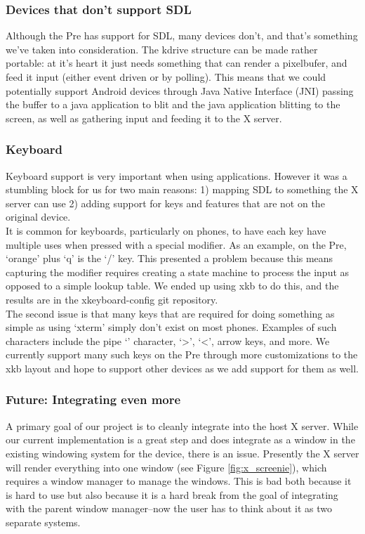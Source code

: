 \subsubsection{Devices that don't support SDL}
Although the Pre has support for SDL, many devices don't, and that's something we've taken into consideration.  The kdrive structure can be made rather portable: at it's heart it just needs something that can render a pixelbufer, and feed it input (either event driven or by polling).  This means that we could potentially support Android devices through Java Native Interface (JNI) \cite{jni} passing the buffer to a java application to blit and the java application blitting to the screen, as well as gathering input and feeding it to the X server.
\subsubsection{Keyboard}
Keyboard support is very important when using applications.  However it was a stumbling block for us for two main reasons: 1) mapping SDL to something the X server can use 2) adding support for keys and features that are not on the original device.\\

It is common for keyboards, particularly on phones, to have each key have multiple uses when pressed with a special modifier.  As an example, on the Pre, `orange' plus `q' is the `/' key.  This presented a problem because this means capturing the modifier requires creating a state machine to process the input as opposed to a simple lookup table.  We ended up using xkb to do this, and the results are in the xkeyboard-config git repository. \\

The second issue is that many keys that are required for doing something as simple as using `xterm' simply don't exist on most phones.  Examples of such characters include the pipe `\textbar' character, `\textgreater', `\textless', arrow keys, and more.  We currently support many such keys on the Pre through more customizations to the xkb layout and hope to support other devices as we add support for them as well.
\subsubsection{Future: Integrating even more}
A primary goal of our project is to cleanly integrate into the host X server.  While our current implementation is a great step and does integrate as a window in the existing windowing system for the device, there is an issue.  Presently the X server will render everything into one window (see Figure \ref{fig:x_screenie}), which requires a window manager to manage the windows.  This is bad both because it is hard to use but also because it is a hard break from the goal of integrating with the parent window manager--now the user has to think about it as two separate systems.\\

